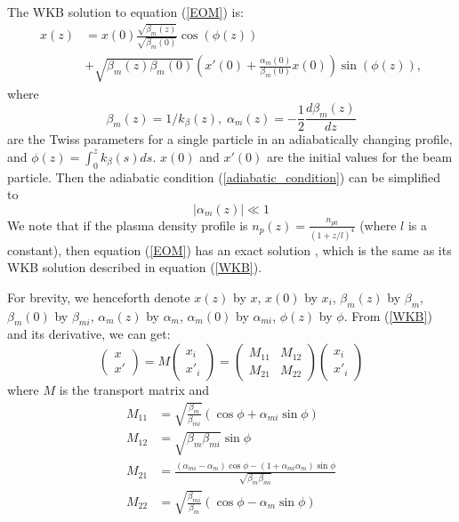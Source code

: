 \documentclass[%
reprint, superscriptaddress,
 amsmath,amssymb, aps,
prstab,
]{revtex4-2}
\begin{document}
The WKB solution to equation (\ref{EOM}) is: \begin{equation}
\begin{aligned} x(z)& = x(0)
\frac{\sqrt{\beta_{m}(z)}}{\sqrt{\beta_{m}(0)}}\cos(\phi(z))\\
&+\sqrt{\beta_{m}(z)\beta_{m}(0)}( x'(0) +
\frac{\alpha_m(0)}{\beta_m(0)}x(0))\sin(\phi(z)), \end{aligned}
\label{WKB} \end{equation} where 
\begin{equation}
\beta_m(z) = 1/k_{\beta}(z),\; \alpha_m(z) =
-\frac{1}{2}\frac{d\beta_m(z)}{dz}
\label{matchedAlphaBeta}
\end{equation}
are the Twiss parameters for a single particle in an adiabatically changing profile, 
and $\phi(z) = \int_{0}^{z}
k_{\beta}(s) ds$. $x(0)$ and $x'(0)$ are the initial values for
the beam particle. Then the adiabatic condition (\ref{adiabatic_condition}) can be simplified to \cite{Robert}
 \begin{equation}
 |\alpha_m(z)| \ll 1
 \label{adiabatic_condition_alpha}
 \end{equation}
We note that if the plasma density profile is $n_p(z)
= \frac{n_{p0}}{(1+z/l)^4}$ (where $l$ is a constant), then equation
(\ref{EOM}) has an exact solution \cite{German2014}, which is the same
as its WKB solution described in equation (\ref{WKB}).

For brevity, we henceforth denote $x(z)$ by $x$, $x(0)$ by $x_i$, 
$\beta_m(z)$ by $\beta_{m}$, $\beta_m(0)$ by $\beta_{mi}$, 
$\alpha_m(z)$ by $\alpha_{m}$, $\alpha_m(0)$ by $\alpha_{mi}$, $\phi(z)$ by $\phi$.
From (\ref{WKB}) and its derivative, we can get: \[ \begin{pmatrix} x \\ x'
\end{pmatrix} = M \begin{pmatrix} x_i \\ x'_i \end{pmatrix} =
\begin{pmatrix} M_{11} & M_{12} \\ M_{21} & M_{22} \end{pmatrix}
\begin{pmatrix} x_i \\ x'_i \end{pmatrix} \] where $M$ is the
transport matrix and \[ \begin{aligned} M_{11} &=
\sqrt{\frac{\beta_m}{\beta_{mi}}}(\cos \phi + \alpha_{mi}\sin \phi)
\\ M_{12} &= \sqrt{\beta_m\beta_{mi}}\sin \phi \\ M_{21} &=
\frac{(\alpha_{mi}-\alpha_m)\cos \phi -
(1+\alpha_{mi}\alpha_m)\sin \phi}{\sqrt{\beta_m\beta_{mi}}} \\
M_{22} &= \sqrt{\frac{\beta_{mi}}{\beta_m}}(\cos \phi -
\alpha_m\sin \phi) \end{aligned} \]
\end{document}
